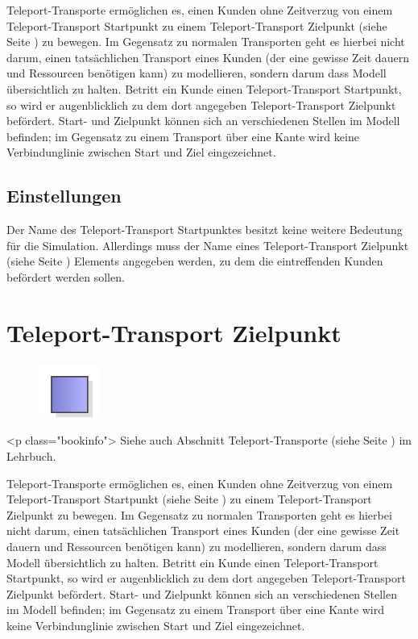 Teleport-Transporte ermöglichen es, einen Kunden ohne Zeitverzug
von einem Teleport-Transport Startpunkt zu einem 
Teleport-Transport Zielpunkt (siehe Seite \pageref{ref:ModelElementTeleportDestination}) 
zu bewegen. Im Gegensatz zu normalen Transporten geht es hierbei nicht darum,
einen tatsächlichen Transport eines Kunden (der eine gewisse Zeit dauern und
Ressourcen benötigen kann) zu modellieren, sondern darum dass Modell übersichtlich
zu halten. Betritt ein Kunde einen Teleport-Transport Startpunkt, so wird er
augenblicklich zu dem dort angegeben Teleport-Transport Zielpunkt befördert.
Start- und Zielpunkt können sich an verschiedenen Stellen im Modell befinden;
im Gegensatz zu einem Transport über eine Kante wird keine Verbindunglinie
zwischen Start und Ziel eingezeichnet.

\subsection*{Einstellungen}

Der Name des Teleport-Transport Startpunktes besitzt keine weitere Bedeutung
für die Simulation. Allerdings muss der Name eines
Teleport-Transport Zielpunkt (siehe Seite \pageref{ref:ModelElementTeleportDestination}) 
Elements angegeben werden, zu dem die eintreffenden Kunden befördert werden sollen.


\section{Teleport-Transport Zielpunkt}
\label{ref:ModelElementTeleportDestination}

\begin{figure}
\vspace{-22pt}
\includegraphics[width=2cm]{imageModelElementTeleportDestination.png}
\vspace{-22pt}
\end{figure}

<p class="bookinfo">
Siehe auch Abschnitt Teleport-Transporte (siehe Seite \pageref{ref:book:8.3.5}) im Lehrbuch.

Teleport-Transporte ermöglichen es, einen Kunden ohne Zeitverzug
von einem Teleport-Transport Startpunkt (siehe Seite \pageref{ref:ModelElementTeleportSource}) 
zu einem Teleport-Transport Zielpunkt zu bewegen. Im Gegensatz zu normalen
Transporten geht es hierbei nicht darum, einen tatsächlichen Transport eines Kunden
(der eine gewisse Zeit dauern und Ressourcen benötigen kann) zu modellieren,
sondern darum dass Modell übersichtlich zu halten. Betritt ein Kunde einen
Teleport-Transport Startpunkt, so wird er augenblicklich zu dem dort angegeben
Teleport-Transport Zielpunkt befördert.
Start- und Zielpunkt können sich an verschiedenen Stellen im Modell befinden;
im Gegensatz zu einem Transport über eine Kante wird keine Verbindunglinie
zwischen Start und Ziel eingezeichnet.


